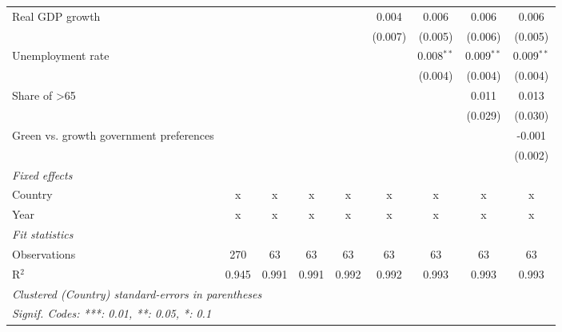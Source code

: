 \begin{table}[htbp]
\begin{tabular}{lcccccccc}
      Real GDP growth                                                                    &         &         &         &             & 0.004        & 0.006        & 0.006        & 0.006\\   
                                                                                         &         &         &         &             & (0.007)      & (0.005)      & (0.006)      & (0.005)\\   
      Unemployment rate                                                                  &         &         &         &             &              & 0.008$^{**}$ & 0.009$^{**}$ & 0.009$^{**}$\\   
                                                                                         &         &         &         &             &              & (0.004)      & (0.004)      & (0.004)\\   
      Share of >65                                                                       &         &         &         &             &              &              & 0.011        & 0.013\\   
                                                                                         &         &         &         &             &              &              & (0.029)      & (0.030)\\   
      Green vs. growth government preferences                                            &         &         &         &             &              &              &              & -0.001\\   
                                                                                         &         &         &         &             &              &              &              & (0.002)\\   
      \emph{Fixed effects}\\
      Country                                                                            & x       & x       & x       & x           & x            & x            & x            & x\\  
      Year                                                                               & x       & x       & x       & x           & x            & x            & x            & x\\  
      \midrule \emph{Fit statistics}\\
      Observations                                                                       & 270     & 63      & 63      & 63          & 63           & 63           & 63           & 63\\  
      R$^2$                                                                              & 0.945   & 0.991   & 0.991   & 0.992       & 0.992        & 0.993        & 0.993        & 0.993\\  
      \midrule
      \multicolumn{9}{l}{\emph{Clustered (Country) standard-errors in parentheses}}\\
      \multicolumn{9}{l}{\emph{Signif. Codes: ***: 0.01, **: 0.05, *: 0.1}}\\
   \end{tabular}
\end{table}


